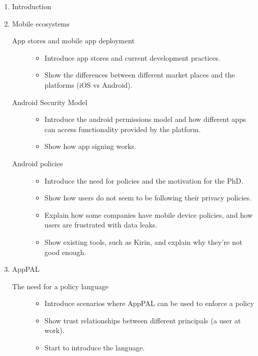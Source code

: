 \documentclass[a4paper]{scrartcl}
\begin{document}
\begin{enumerate}
  \item Introduction
  \item Mobile ecosystems
    \begin{description}
      \item[App stores and mobile app deployment]
        \hfill
        \begin{itemize}
          \item Introduce app stores and current development practices.
          \item Show the differences between different market places and the platforms (iOS vs Android).
        \end{itemize}
      \item[Android Security Model]
        \hfill
        \begin{itemize}
          \item Introduce the android permissions model and how different apps can access functionality provided by the platform.
          \item Show how app signing works.
        \end{itemize}
      \item[Android policies]
        \hfill
        \begin{itemize}
          \item Introduce the need for policies and the motivation for the PhD.
          \item Show how users do not seem to be following their privacy policies.
          \item Explain how some companies have mobile device policies, and how users are frustrated with data leaks.
          \item Show existing tools, such as Kirin, and explain why they're not good enough.
        \end{itemize}
    \end{description}
  \item AppPAL
    \begin{description}
      \item[The need for a policy language]
        \hfill
        \begin{itemize}
          \item Introduce scenarios where AppPAL can be used to enforce a policy
          \item Show trust relationships between different principals (a user at work).
          \item Start to introduce the language.

\end{itemize}
\end{description}
\end{enumerate}
\end{document}
